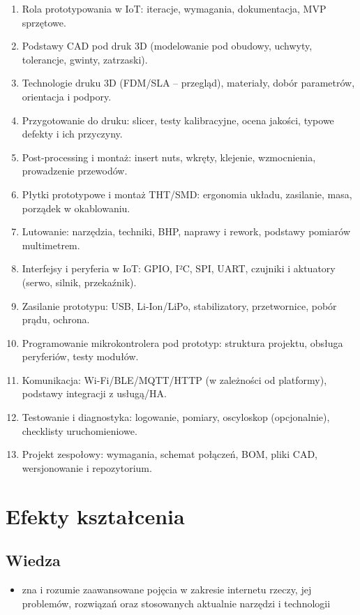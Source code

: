 \documentclass[12pt, a4paper]{article}
\begin{document}
\begin{enumerate}
  \item Rola prototypowania w IoT: iteracje, wymagania, dokumentacja, MVP sprzętowe.
  \item Podstawy CAD pod druk 3D (modelowanie pod obudowy, uchwyty, tolerancje, gwinty, zatrzaski).
  \item Technologie druku 3D (FDM/SLA – przegląd), materiały, dobór parametrów, orientacja i podpory.
  \item Przygotowanie do druku: slicer, testy kalibracyjne, ocena jakości, typowe defekty i ich przyczyny.
  \item Post-processing i montaż: insert nuts, wkręty, klejenie, wzmocnienia, prowadzenie przewodów.
  \item Płytki prototypowe i montaż THT/SMD: ergonomia układu, zasilanie, masa, porządek w okablowaniu.
  \item Lutowanie: narzędzia, techniki, BHP, naprawy i rework, podstawy pomiarów multimetrem.
  \item Interfejsy i peryferia w IoT: GPIO, I²C, SPI, UART, czujniki i aktuatory (serwo, silnik, przekaźnik).
  \item Zasilanie prototypu: USB, Li-Ion/LiPo, stabilizatory, przetwornice, pobór prądu, ochrona.
  \item Programowanie mikrokontrolera pod prototyp: struktura projektu, obsługa peryferiów, testy modułów.
  \item Komunikacja: Wi-Fi/BLE/MQTT/HTTP (w zależności od platformy), podstawy integracji z usługą/HA.
  \item Testowanie i diagnostyka: logowanie, pomiary, oscyloskop (opcjonalnie), checklisty uruchomieniowe.
  \item Projekt zespołowy: wymagania, schemat połączeń, BOM, pliki CAD, wersjonowanie i repozytorium.
\end{enumerate}

\section{Efekty kształcenia}

\subsection*{Wiedza}
\begin{itemize}
  \item zna i rozumie zaawansowane pojęcia w zakresie internetu rzeczy, jej problemów, rozwiązań oraz stosowanych aktualnie narzędzi i technologii
\end{itemize}
\end{document}
